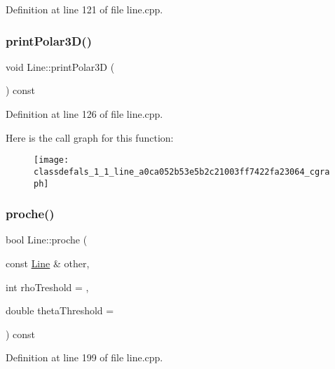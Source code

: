 Definition at line 121 of file line.\+cpp.

\mbox{\label{classdefals_1_1_line_a0ca052b53e5b2c21003ff7422fa23064}} 
\subsubsection{\texorpdfstring{print\+Polar3\+D()}{printPolar3D()}}
{\footnotesize\ttfamily void Line\+::print\+Polar3D (\begin{DoxyParamCaption}{ }\end{DoxyParamCaption}) const}



Definition at line 126 of file line.\+cpp.

Here is the call graph for this function\+:\nopagebreak
\begin{figure}[H]
\begin{center}
\leavevmode
\texttt{[image: classdefals\_1\_1\_line\_a0ca052b53e5b2c21003ff7422fa23064\_cgraph]}
\end{center}
\end{figure}
\mbox{\label{classdefals_1_1_line_a99488154d6dc7781097fdd1e71546395}} 
\subsubsection{\texorpdfstring{proche()}{proche()}}
{\footnotesize\ttfamily bool Line\+::proche (\begin{DoxyParamCaption}\item[{const \hyperlink{classdefals_1_1_line}{Line} \&}]{other,  }\item[{int}]{rho\+Treshold = {},  }\item[{double}]{theta\+Threshold = {} }\end{DoxyParamCaption}) const}



Definition at line 199 of file line.\+cpp.

\mbox{\label{classdefals_1_1_line_a5807943405bdaadfea9b35eeb63fdd46}} 
